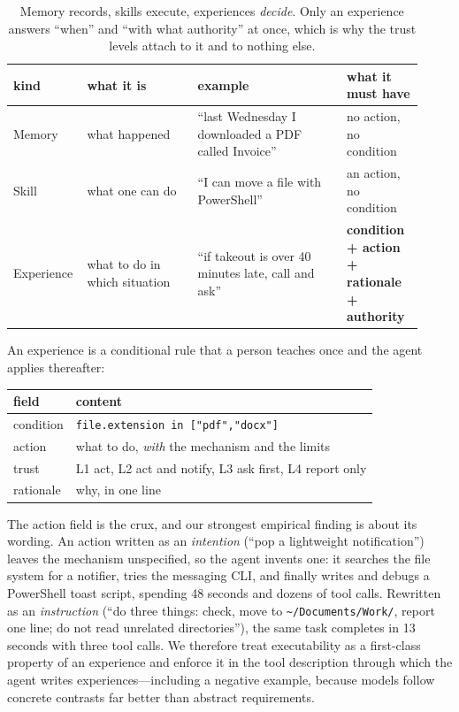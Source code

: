 \documentclass[10pt,a4paper]{article}
\begin{document}
\begin{table}[t]
\centering\small
\begin{tabular}{@{}p{0.13\linewidth}p{0.26\linewidth}p{0.35\linewidth}p{0.18\linewidth}@{}}
\toprule
kind & what it is & example & what it must have \\
\midrule
Memory & what happened & ``last Wednesday I downloaded a PDF called Invoice'' & no action, no condition \\
Skill & what one can do & ``I can move a file with PowerShell'' & an action, no condition \\
Experience & what to do in which situation & ``if takeout is over 40 minutes late, call and ask'' & \textbf{condition + action + rationale + authority} \\
\bottomrule
\end{tabular}
\caption{Memory records, skills execute, experiences \emph{decide}. Only an
experience answers ``when'' and ``with what authority'' at once, which is why
the trust levels attach to it and to nothing else.}
\label{tab:kinds}
\end{table}

An experience is a conditional rule that a person teaches once and the agent
applies thereafter:
\begin{center}
\small
\begin{tabular}{@{}ll@{}}
\toprule
field & content \\
\midrule
condition & \texttt{file.extension in ["pdf","docx"]} \\
action & what to do, \emph{with} the mechanism and the limits \\
trust & L1 act, L2 act and notify, L3 ask first, L4 report only \\
rationale & why, in one line \\
\bottomrule
\end{tabular}
\end{center}

The action field is the crux, and our strongest empirical finding is about
its wording. An action written as an \emph{intention} (``pop a lightweight
notification'') leaves the mechanism unspecified, so the agent invents one:
it searches the file system for a notifier, tries the messaging CLI, and
finally writes and debugs a PowerShell toast script, spending 48 seconds and
dozens of tool calls. Rewritten as an \emph{instruction} (``do three things:
check, move to \verb|~/Documents/Work/|, report one line; do not read
unrelated directories''), the same task completes in 13 seconds with three
tool calls. We therefore treat executability as a first-class property of an
experience and enforce it in the tool description through which the agent
writes experiences---including a negative example, because models follow
concrete contrasts far better than abstract requirements.
\end{document}
